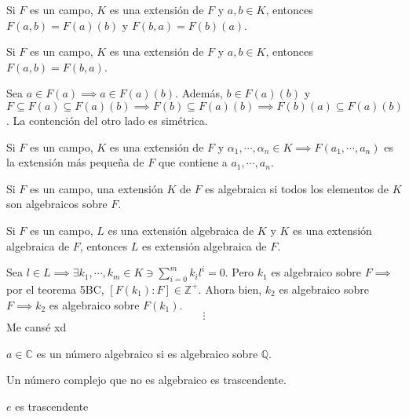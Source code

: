 \begin{nota}
    Si $F$ es un campo, $K$ es una extensión de $F$ y $a,b\in K$, entonces $F(a,b)=F(a)(b)$ y $F(b,a)=F(b)(a)$.
\end{nota}

\begin{prop}
    Si $F$ es un campo, $K$ es una extensión de $F$ y $a,b\in K$, entonces $F(a,b)=F(b,a)$.
    \begin{dem}
        Sea $a\in F(a)\implies a\in F(a)(b)$. Además, $b\in F(a)(b)$ y $F\subseteq F(a)\subseteq F(a)(b)\implies F(b)\subseteq F(a)(b)\implies F(b)(a)\subseteq F(a)(b)$. La contención del otro lado es simétrica. 
    \end{dem}
\end{prop}

\begin{nota}
    Si $F$ es un campo, $K$ es una extensión de $F$ y $\alpha_1,\cdots,\alpha_n\in K\implies F(a_1,\cdots,a_n)$ es la extensión más pequeña de $F$ que contiene a $a_1,\cdots, a_n$.
\end{nota}

\begin{definicion}
    Si $F$ es un campo, una extensión $K$ de $F$ es algebraica si todos los elementos de $K$ son algebraicos sobre $F$.
\end{definicion}

\begin{teorema}[5E]
    Si $F$ es un campo, $L$ es una extensión algebraica de $K$ y $K$ es una extensión algebraica de $F$, entonces $L$ es extensión algebraica de $F$. 
    \begin{dem}
        Sea $l\in L\implies \exists k_1,\cdots, k_m\in K\ni \sum_{i=0}^m k_i l^i=0$. Pero $k_1$ es algebraico sobre $F\implies$ por el teorema 5BC, $[F(k_1):F]\in \mathbb{Z}^+$. Ahora bien, $k_2$ es algebraico sobre $F\implies k_2$ es algebraico sobre $F(k_1)$.  
        $$\vdots $$
        Me cansé xd 
    \end{dem}
\end{teorema}

\begin{definicion}
    $a\in \mathbb{C}$ es un número algebraico si es algebraico sobre $\mathbb{Q}$. 
\end{definicion}

\begin{definicion}
    Un número complejo que no es algebraico es trascendente. 
\end{definicion}

\begin{cajita}
    \begin{ejemplo}
        $e$ es trascendente
    \end{ejemplo}
\end{cajita}
